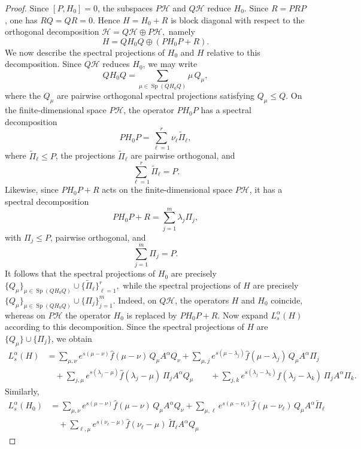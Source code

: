 \documentclass[11pt]{amsart}
\newcommand{\1}{\mathbbm{1}}
\newcommand{\spec}{\operatorname{Sp}}
\theoremstyle{plain}
\theoremstyle{definition}
\theoremstyle{remark}
\numberwithin{equation}{section}
\begin{document}
\begin{proof}
Since \([P,H_0]=0\), the subspaces \(P\mathcal H\) and \(Q\mathcal H\) reduce \(H_0\). Since \(R=PRP\), one has $RQ=QR=0.$
Hence \(H=H_0+R\) is block diagonal with respect to the orthogonal decomposition
$\mathcal H=Q\mathcal H\oplus P\mathcal H,$
namely
\[
H=QH_0Q\oplus (PH_0P+R).
\]
We now describe the spectral projections of \(H_0\) and \(H\) relative to this decomposition. Since \(Q\mathcal H\) reduces \(H_0\), we may write
\[
QH_0Q=\sum_{\mu\in \spec(QH_0Q)} \mu\,Q_\mu,
\]
where the \(Q_\mu\) are pairwise orthogonal spectral projections satisfying \(Q_\mu\le Q\). On the finite-dimensional space \(P\mathcal H\), the operator \(PH_0P\) has a spectral decomposition
\[
PH_0P=\sum_{\ell=1}^r \nu_\ell \widetilde\Pi_\ell,
\]
where \(\widetilde\Pi_\ell\le P\), the projections \(\widetilde\Pi_\ell\) are pairwise orthogonal, and
\[
\sum_{\ell=1}^r \widetilde\Pi_\ell=P.
\]
Likewise, since \(PH_0P+R\) acts on the finite-dimensional space \(P\mathcal H\), it has a spectral decomposition
\[
PH_0P+R=\sum_{j=1}^m \lambda_j \Pi_j,
\]
with \(\Pi_j\le P\), pairwise orthogonal, and
\[
\sum_{j=1}^m \Pi_j=P.
\]
It follows that the spectral projections of \(H_0\) are precisely $\{Q_\mu\}_{\mu\in \spec(QH_0Q)}\cup \{\widetilde\Pi_\ell\}_{\ell=1}^r,$
while the spectral projections of \(H\) are precisely $\{Q_\mu\}_{\mu\in \spec(QH_0Q)}\cup \{\Pi_j\}_{j=1}^m.$
Indeed, on \(Q\mathcal H\), the operators \(H\) and \(H_0\) coincide, whereas on \(P\mathcal H\) the operator \(H_0\) is replaced by \(PH_0P+R\).
Now expand \(L_s^\alpha(H)\) according to this decomposition. Since the spectral projections of \(H\) are \(\{Q_\mu\}\cup\{\Pi_j\}\), we obtain
\[
\begin{aligned}
L_s^\alpha(H)
&=
\sum_{\mu,\nu} e^{s(\mu-\nu)}\widehat f(\mu-\nu)\,Q_\mu A^\alpha Q_\nu 
+\sum_{\mu,j} e^{s(\mu-\lambda_j)}\widehat f(\mu-\lambda_j)\,Q_\mu A^\alpha \Pi_j 
\\&\quad  +\sum_{j,\mu} e^{s(\lambda_j-\mu)}\widehat f(\lambda_j-\mu)\,\Pi_j A^\alpha Q_\mu \qquad +\sum_{j,k} e^{s(\lambda_j-\lambda_k)}\widehat f(\lambda_j-\lambda_k)\,\Pi_j A^\alpha \Pi_k .
\end{aligned}
\]
Similarly,
\[
\begin{aligned}
L_s^\alpha(H_0)
&=
\sum_{\mu,\nu} e^{s(\mu-\nu)}\widehat f(\mu-\nu)\,Q_\mu A^\alpha Q_\nu 
+\sum_{\mu,\ell} e^{s(\mu-\nu_\ell)}\widehat f(\mu-\nu_\ell)\,Q_\mu A^\alpha \widetilde\Pi_\ell \\
&\quad +\sum_{\ell,\mu} e^{s(\nu_\ell-\mu)}\widehat f(\nu_\ell-\mu)\,\widetilde\Pi_\ell A^\alpha Q_\mu

\end{aligned}\]
\end{proof}
\end{document}
